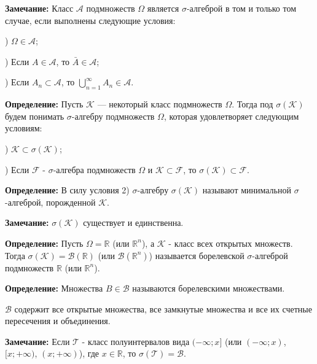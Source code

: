 \vspace{5mm}

\textbf{Замечание:} Класс $\mathscr{A}$ подмножеств $\Omega$ является $\sigma$-алгеброй в том и только том случае, если выполнены следующие условия:

) $\Omega \in \mathscr{A}$;

) Если $A \in \mathscr{A}$, то $\bar{A} \in \mathscr{A}$;

) Если ${A_{n}} \subset \mathscr{A}$, то $\bigcup\limits_{n = 1}^{\infty} A_{n} \in \mathscr{A}$.
\vspace{5mm}

\textbf{Определение:} Пусть $\mathscr{K}$ — некоторый класс подмножеств $\Omega$. Тогда под $\sigma(\mathscr{K})$ будем понимать $\sigma$-алгебру подмножеств $\Omega$, которая удовлетворяет следующим условиям:

) $\mathscr{K} \subset \sigma(\mathscr{K})$;

) Если $\mathscr{F}$ - $\sigma$-алгебра подмножеств $\Omega$ и $\mathscr{K} \subset \mathscr{F}$, то $\sigma(\mathscr{K}) \subset \mathscr{F}$.
\vspace{5mm}

\textbf{Определение:} В силу условия 2) $\sigma$-алгебру $\sigma(\mathscr{K})$ называют минимальной $\sigma$-алгеброй, порожденной $\mathscr{K}$.
\vspace{5mm}

\textbf{Замечание:} $\sigma(\mathscr{K})$ существует и единственна.
\vspace{5mm}

\textbf{Определение:} Пусть $\Omega = \mathbb{R}$ (или $\mathbb{R}^n$), а $\mathscr{K}$ - класс всех открытых множеств. Тогда $\sigma(\mathscr{K}) = \mathscr{B}(\mathbb{R})$ (или $\mathscr{B}(\mathbb{R}^n)$) называется борелевской $\sigma$-алгеброй подмножеств $\mathbb{R}$ (или $\mathbb{R}^n$).
\vspace{5mm}

\textbf{Определение:} Множества $B \in \mathscr{B}$ называются борелевскими множествами.
\vspace{5mm}

$\mathscr{B}$ содержит все открытые множества, все замкнутые множества и все их счетные пересечения и объединения.
\vspace{5mm}

\textbf{Замечание:} Если $\mathscr{T}$ -  класс полуинтервалов вида $(-\infty ; x]$ (или $(-\infty ; x)$, $[x; +\infty)$, $(x; +\infty)$), где $x \in \mathbb{R}$, то $\sigma(\mathscr{T}) = \mathscr{B}$.
\vspace{5mm}

